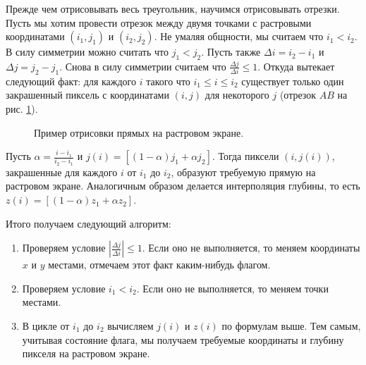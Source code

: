 \documentclass{article}
\begin{document}
Прежде чем отрисовывать весь треугольник, научимся отрисовывать отрезки.
Пусть мы хотим провести отрезок между двумя точками с растровыми координатами $(i_{1}, j_{1})$ и $(i_{2}, j_{2})$.
Не умаляя общности, мы считаем что $i_{1} < i_{2}$.
В силу симметрии можно считать что $j_{1} < j_{2}$.
Пусть также $\Delta i = i_{2} - i_{1}$ и $\Delta j = j_{2} - j_{1}$.
Снова в силу симметрии считаем что $\frac{\Delta j}{\Delta i} \le 1$.
Откуда вытекает следующий факт: для каждого $i$ такого что $i_{1} \le i \le i_{2}$ существует только один закрашенный пиксель с координатами $(i, j)$ для некоторого $j$ (отрезок $AB$ на рис. \ref{rasterized line}).

\begin{figure}[ht]
    \caption{Пример отрисовки прямых на растровом экране.}
    \label{rasterized line}
\end{figure}

Пусть $\alpha = \frac{i - i_{1}}{i_{2} - i_{1}}$ и $j(i) = [(1 - \alpha) j_{1} + \alpha j_{2}]$.
Тогда пиксели $(i, j(i))$, закрашенные для каждого $i$ от $i_{1}$ до $i_{2}$, образуют требуемую прямую на растровом экране.
Аналогичным образом делается интерполяция глубины, то есть $z(i) = [(1 - \alpha)z_{1} + \alpha z_{2}]$.

Итого получаем следующий алгоритм:

\begin{enumerate}
	\item Проверяем условие $\left| \frac{\Delta j}{\Delta i} \right| \le 1$.
	Если оно не выполняется, то меняем координаты $x$ и $y$ местами, отмечаем этот факт каким-нибудь флагом.
	\item Проверяем условие $i_{1} < i_{2}$.
	Если оно не выполняется, то меняем точки местами.
	\item В цикле от $i_{1}$ до $i_{2}$ вычисляем $j(i)$ и $z(i)$ по формулам выше.
	Тем самым, учитывая состояние флага, мы получаем требуемые координаты и глубину пикселя на растровом экране.
\end{enumerate}
\end{document}
